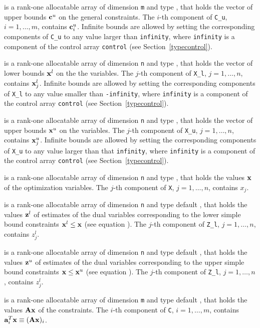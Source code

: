 \documentclass{galahad}
\begin{document}
\begin{description}
 is a rank-one allocatable array of dimension {\tt m} and type 
\realdp, that holds the vector of upper bounds ${\mathbf{c}}^{u}$ 
on the general constraints. The $i$-th component of 
{\tt C\_u}, $i = 1,  \ldots ,  m$, contains ${\mathbf{c}}_{i}^{u}$.
Infinite bounds are allowed by setting the corresponding 
components of {\tt C\_u} to any value larger than {\tt infinity}, 
where {\tt infinity} is a component of the control array {\tt control} 
(see Section~\ref{typecontrol}).

 is a rank-one allocatable array of dimension {\tt n} and type 
\realdp, that holds
the vector of lower bounds ${\mathbf{x}}^{l}$ on the the variables.
The $j$-th component of {\tt X\_l}, $j = 1, \ldots , n$, 
contains ${\mathbf{x}}_{j}^{l}$.
Infinite bounds are allowed by setting the corresponding 
components of {\tt X\_l} to any value smaller than {\tt -infinity}, 
where {\tt infinity} is a component of the control array {\tt control} 
(see Section~\ref{typecontrol}).

 is a rank-one allocatable array of dimension {\tt n} and type 
\realdp, that holds
the vector of upper bounds ${\mathbf{x}}^{u}$ on the variables.
The $j$-th component of {\tt X\_u}, $j = 1, \ldots , n$, 
contains ${\mathbf{x}}_{j}^{u}$.
Infinite bounds are allowed by setting the corresponding 
components of {\tt X\_u} to any value larger than that {\tt infinity}, 
where {\tt infinity} is a component of the control array {\tt control} 
(see Section~\ref{typecontrol}).

 is a rank-one allocatable array of dimension {\tt n} and type 
\realdp, 
that holds the values ${\mathbf{x}}$ of the optimization variables.
The $j$-th component of {\tt X}, $j = 1,  \ldots , n$, contains $x_{j}$.  

 is a rank-one allocatable array of dimension {\tt n} and type default 
\realdp, that holds
the values ${\mathbf{z}}^{l}$ of estimates  of the dual variables 
corresponding to the lower simple bound constraints ${\mathbf{x}}^{l} \leq {\mathbf{x}}$
(see equation ).
The $j$-th component of {\tt Z\_l}, $j = 1,  \ldots ,  n$, 
contains $z_{j}^{l}$.  

 is a rank-one allocatable array of dimension {\tt n} and type default 
\realdp, that holds
the values ${\mathbf{z}}^{u}$ of estimates  of the dual variables 
corresponding to the upper simple bound constraints ${\mathbf{x}} \leq {\mathbf{x}}^{u}$
(see equation ).
The $j$-th component of {\tt Z\_l}, $j = 1,  \ldots ,  n$, 
contains $z_{j}^{l}$.  

 is a rank-one allocatable array of dimension {\tt m} and type default 
\realdp, that holds
the values ${\mathbf{A}} {\mathbf{x}}$ of the constraints.
The $i$-th component of {\tt C}, $i = 1,  \ldots ,  m$, contains 
${\mathbf{a}}_{i}^{T}{\mathbf{x}} \equiv ({\mathbf{A}} {\mathbf{x}})_{i}$.  


\end{description}
\end{document}
